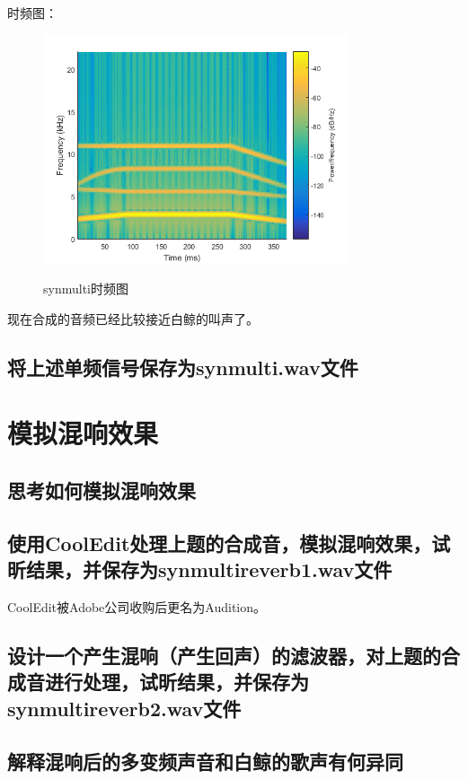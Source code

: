 \documentclass{article}
\begin{document}
            时频图：
            \begin{figure}[htb]
                \centering
                \includegraphics[width=9cm]{figure12.png}
                \label{fig:synmulti-ft}\caption{synmulti时频图}
            \end{figure}

            现在合成的音频已经比较接近白鲸的叫声了。
            
        \subsection{将上述单频信号保存为synmulti.wav文件}
        
    \section{模拟混响效果}
        \subsection{思考如何模拟混响效果}
        
        \subsection{使用CoolEdit处理上题的合成音，模拟混响效果，试昕结果，并保存为synmultireverb1.wav文件}
            CoolEdit被Adobe公司收购后更名为Audition。
        
        \subsection{设计一个产生混响（产生回声）的滤波器，对上题的合成音进行处理，试昕结果，并保存为synmultireverb2.wav文件}
        
        \subsection{解释混响后的多变频声音和白鲸的歌声有何异同}
        
\end{document}

